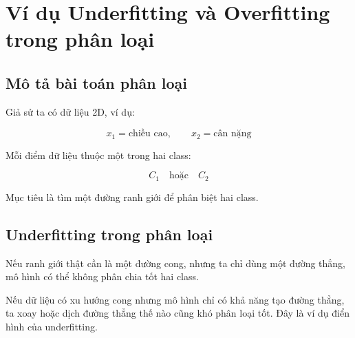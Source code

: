\documentclass[12pt,a4paper]{report}
\begin{document}
\chapter{Ví dụ Underfitting và Overfitting trong phân loại}

\section{Mô tả bài toán phân loại}

Giả sử ta có dữ liệu 2D, ví dụ:

\[
    x_1 = \text{chiều cao}, \qquad x_2 = \text{cân nặng}
\]

Mỗi điểm dữ liệu thuộc một trong hai class:

\[
    C_1 \quad \text{hoặc} \quad C_2
\]

Mục tiêu là tìm một đường ranh giới để phân biệt hai class.

\section{Underfitting trong phân loại}

Nếu ranh giới thật cần là một đường cong, nhưng ta chỉ dùng một đường thẳng, mô hình có thể không phân chia tốt hai class.

\begin{center}
\end{center}

\begin{vidu}
Nếu dữ liệu có xu hướng cong nhưng mô hình chỉ có khả năng tạo đường thẳng, ta xoay hoặc dịch đường thẳng thế nào cũng khó phân loại tốt. Đây là ví dụ điển hình của underfitting.
\end{vidu}
\end{document}
